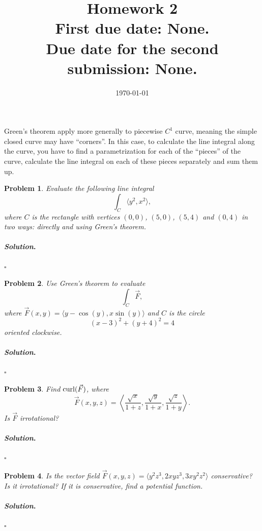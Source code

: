 \documentclass[reqno]{amsart}
\theoremstyle{plain}
\newtheorem{problem}{Problem}
\theoremstyle{definition}
\newenvironment{solution}{\paragraph{\emph{Solution}.}}{\hfill$\square$}
\begin{document}
 

\title[Homework 2]{Homework 2 \\ First due date: None.  \\  Due date for the second submission:  None.}

\date{\today} 
\maketitle 

Green's theorem apply more generally to piecewise $C^{1}$ curve, meaning the simple closed curve may have ``corners''.  In this case, to calculate the line integral along the curve, you have to find a parametrization for each of the ``pieces'' of the curve, calculate the line integral on each of these pieces separately and sum them up.

\begin{problem}
Evaluate the following line integral
$$\int_{C} \langle y^{2}, x^{2} \rangle, $$
where $C$ is the rectangle with vertices $(0,0)$, $(5,0)$, $(5,4)$ and $(0,4)$ in two ways:  directly and using Green's theorem.
\end{problem}
\begin{solution}

\end{solution}


\begin{problem}
Use Green's theorem to evaluate
$$\int_{C} \vec{F}, $$
where $\vec{F}(x,y) = \langle y - \cos(y),x \sin(y) \rangle$ and $C$ is the circle 
$$(x-3)^{2} + (y+4)^{2} = 4 $$
oriented clockwise.
\end{problem}
\begin{solution}

\end{solution}

\begin{problem}
Find ${\rm curl}(\vec{F})$, where
$$\vec{F}(x,y,z) = \left\langle \frac{\sqrt{x}}{1 + z}, \frac{\sqrt{y}}{1+x}, \frac{\sqrt{z}}{1+y}\right\rangle. $$
Is $\vec{F}$ irrotational?
\end{problem}
\begin{solution}

\end{solution}

\begin{problem}
Is the vector field $\vec{F}(x,y,z) = \langle y^{2}z^{3},2xyz^{3},3xy^{2}z^{2} \rangle$ conservative?  Is it irrotational?  If it is conservative, find a potential function.
\end{problem}
\begin{solution}

\end{solution}
\end{document}
